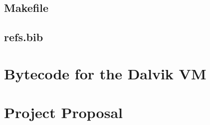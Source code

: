 \documentclass[12pt,twoside,notitlepage]{report}
\begin{document}
\section{\label{makefile}Makefile}
{\scriptsize}

\section{refs.bib}
{\scriptsize}


\cleardoublepage

\chapter{Bytecode for the Dalvik VM}

% 


\cleardoublepage

\chapter{Project Proposal}


\end{document}
